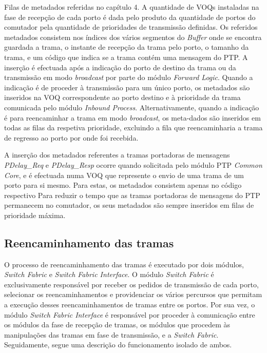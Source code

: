 Filas de metadados referidas no capítulo 4. A quantidade de VOQs instaladas na fase de recepção de cada porto é dada pelo produto da quantidade de portos do comutador pela quantidade de prioridades de transmissão definidas. Os referidos metadados consistem nos índices dos vários segmentos do \textit{Buffer} onde se encontra guardada a trama, o instante de recepção da trama pelo porto, o tamanho da trama, e um código que indica se a trama contém uma mensagem do PTP.  A inserção é efectuada após a indicação do porto de destino da trama ou da transmissão em modo \textit{broadcast} por parte do módulo \textit{Forward Logic}. Quando a indicação é de proceder à transmissão para um único porto, os metadados são inseridos na VOQ correspondente ao porto destino e à prioridade da trama comunicada pelo módulo \textit{Inbound Process}. Alternativamente, quando a indicação é para reencaminhar a trama em modo \textit{broadcast}, os meta-dados são inseridos em todas as filas da respetiva prioridade, excluindo a fila que reencaminharia a trama de regresso ao porto por onde foi recebida.\par
 A inserção dos metadados referentes a tramas portadoras de mensagens \textit{PDelay\_Req} e \textit{PDelay\_Resp} ocorre quando solicitada pelo módulo PTP \textit{Common Core}, e é efectuada numa VOQ que represente o envio de uma trama de um porto para si mesmo. Para estas, os metadados consistem apenas no código respectivo Para reduzir o tempo que as tramas portadoras de mensagens do PTP permanecem no comutador, os seus metadados são sempre inseridos em filas de prioridade máxima.


\subsection{Reencaminhamento das tramas}

O processo de reencaminhamento das tramas é executado por dois módulos, \textit{Switch Fabric} e \textit{Switch Fabric Interface}. O módulo \textit{Switch Fabric} é exclusivamente responsável por receber os pedidos de transmissão de cada porto, selecionar os reencaminhamentos e providenciar os vários percursos que permitam a execução desses reencaminhamentos de tramas entre os portos. 
Por sua vez, o módulo \textit{Switch Fabric Interface} é responsável por proceder à comunicação entre os módulos da fase de recepção de tramas, os módulos que procedem às manipulações das tramas em fase de transmissão, e a \textit{Switch Fabric}. 
Seguidamente, segue uma descrição do funcionamento isolado de ambos.



